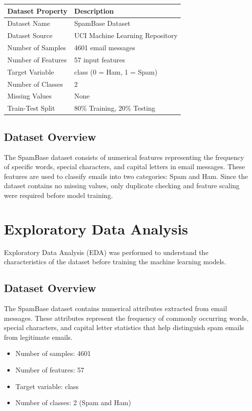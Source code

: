 \documentclass{article}
\begin{document}
\begin{longtable}{|p{5cm}|p{9cm}|} 
\hline 
\textbf{Dataset Property} & \textbf{Description} \\ \hline 
Dataset Name & SpamBase Dataset \\ \hline 
Dataset Source & UCI Machine Learning Repository \\ \hline 
Number of Samples & 4601 email messages \\ \hline 
Number of Features & 57 input features \\ \hline 
Target Variable & class (0 = Ham, 1 = Spam) \\ \hline 
Number of Classes & 2 \\ \hline 
Missing Values & None \\ \hline 
Train-Test Split & 80\% Training, 20\% Testing \\ \hline 
\end{longtable} 

\subsection*{Dataset Overview} 
The SpamBase dataset consists of numerical features representing the frequency of specific words, special characters, and capital letters in email messages. These features are used to classify emails into two categories: Spam and Ham. Since the dataset contains no missing values, only duplicate checking and feature scaling were required before model training. 

\newpage
\section{Exploratory Data Analysis} 
Exploratory Data Analysis (EDA) was performed to understand the characteristics of the dataset before training the machine learning models. 

\subsection{Dataset Overview} 
The SpamBase dataset contains numerical attributes extracted from email messages. These attributes represent the frequency of commonly occurring words, special characters, and capital letter statistics that help distinguish spam emails from legitimate emails. 

\begin{itemize} 
\item Number of samples: 4601 
\item Number of features: 57 
\item Target variable: class 
\item Number of classes: 2 (Spam and Ham) 
\end{itemize} 
\end{document}
